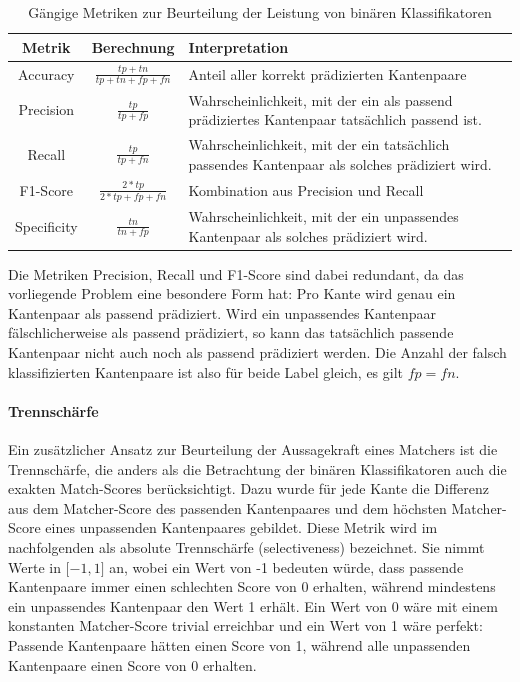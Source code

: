 \begin{table}
    \centering
    \begin{tabular}{||ccp{}||}
        \hline
        Metrik & Berechnung & Interpretation \\
        \hline\hline
        Accuracy     & $\frac{tp + tn}{tp + tn + fp + fn}$ & Anteil aller korrekt prädizierten Kantenpaare                                                  \\
        Precision    & $\frac{tp}{tp + fp}$ & Wahrscheinlichkeit, mit der ein als passend prädiziertes Kantenpaar tatsächlich passend ist.   \\
        Recall       & $\frac{tp}{tp + fn}$ & Wahrscheinlichkeit, mit der ein tatsächlich passendes Kantenpaar als solches prädiziert wird.  \\
        F1-Score     & $\frac{2 * tp}{2 * tp + fp + fn}$ & Kombination aus Precision und Recall                                                          \\
        Specificity  & $\frac{tn}{tn + fp}$ & Wahrscheinlichkeit, mit der ein unpassendes Kantenpaar als solches prädiziert wird.            \\
        \hline
    \end{tabular}
    \caption{Gängige Metriken zur Beurteilung der Leistung von binären Klassifikatoren}
    \label{tab:matcher_eval_metrics}
\end{table}

Die Metriken Precision, Recall und F1-Score sind dabei redundant, da das
vorliegende Problem eine besondere Form hat: Pro Kante wird genau ein
Kantenpaar als passend prädiziert. Wird ein unpassendes Kantenpaar
fälschlicherweise als passend prädiziert, so kann das tatsächlich
passende Kantenpaar nicht auch noch als passend prädiziert werden. Die
Anzahl der falsch klassifizierten Kantenpaare ist also für beide Label
gleich, es gilt $fp=fn$.

\paragraph{Trennschärfe}

Ein zusätzlicher Ansatz zur Beurteilung der Aussagekraft eines
Matchers ist die Trennschärfe, die anders als die Betrachtung der binären Klassifikatoren
auch die exakten Match-Scores berücksichtigt. Dazu wurde für
jede Kante die Differenz aus dem Matcher-Score des passenden
Kantenpaares und dem höchsten Matcher-Score eines unpassenden
Kantenpaares gebildet. Diese Metrik wird im nachfolgenden als absolute
Trennschärfe (selectiveness) bezeichnet. Sie nimmt Werte in ${[}-1,1{]}$ an, wobei ein Wert 
von -1 bedeuten würde, dass passende Kantenpaare immer
einen schlechten Score von 0 erhalten, während mindestens ein
unpassendes Kantenpaar den Wert 1 erhält. Ein Wert von 0 wäre mit einem
konstanten Matcher-Score trivial erreichbar und ein Wert von 1 wäre
perfekt: Passende Kantenpaare hätten einen Score von 1, während alle
unpassenden Kantenpaare einen Score von 0 erhalten.

